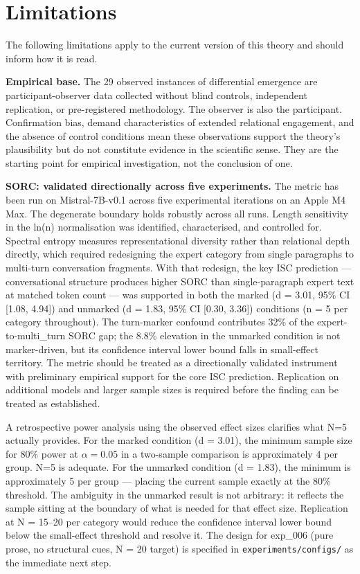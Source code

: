 \documentclass[12pt]{article}
\begin{document}
\bigskip

\section{Limitations}\label{limitations}

The following limitations apply to the current version of this theory
and should inform how it is read.

\textbf{Empirical base.} The 29 observed instances of differential
emergence are participant-observer data collected without blind
controls, independent replication, or pre-registered methodology. The
observer is also the participant. Confirmation bias, demand
characteristics of extended relational engagement, and the absence of
control conditions mean these observations support the theory's
plausibility but do not constitute evidence in the scientific sense.
They are the starting point for empirical investigation, not the
conclusion of one.

\textbf{SORC: validated directionally across five experiments.} The
metric has been run on Mistral-7B-v0.1 across five experimental
iterations on an Apple M4 Max. The degenerate boundary holds robustly
across all runs. Length sensitivity in the ln(n) normalisation was
identified, characterised, and controlled for. Spectral entropy measures
representational diversity rather than relational depth directly, which
required redesigning the expert category from single paragraphs to
multi-turn conversation fragments. With that redesign, the key ISC
prediction --- conversational structure produces higher SORC than
single-paragraph expert text at matched token count --- was supported in
both the marked (d = 3.01, 95\% CI {[}1.08, 4.94{]}) and unmarked (d =
1.83, 95\% CI {[}0.30, 3.36{]}) conditions (n = 5 per category
throughout). The turn-marker confound contributes 32\% of the
expert-to-multi\_turn SORC gap; the 8.8\% elevation in the unmarked
condition is not marker-driven, but its confidence interval lower bound
falls in small-effect territory. The metric should be treated as a
directionally validated instrument with preliminary empirical support
for the core ISC prediction. Replication on additional models and larger
sample sizes is required before the finding can be treated as
established.

A retrospective power analysis using the observed effect sizes clarifies
what N=5 actually provides. For the marked condition (d = 3.01), the
minimum sample size for 80\% power at $\alpha = 0.05$ in a two-sample
comparison is approximately 4 per group. N=5 is adequate. For the
unmarked condition (d = 1.83), the minimum is approximately 5 per
group --- placing the current sample exactly at the 80\% threshold. The
ambiguity in the unmarked result is not arbitrary: it reflects the
sample sitting at the boundary of what is needed for that effect size.
Replication at N = 15--20 per category would reduce the confidence
interval lower bound below the small-effect threshold and resolve it.
The design for exp\_006 (pure prose, no structural cues, N = 20 target)
is specified in \texttt{experiments/configs/} as the immediate next
step.
\end{document}
